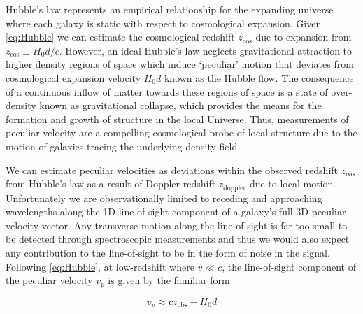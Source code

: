 Hubble's law represents an empirical relationship for the expanding
universe where each galaxy is static with respect to cosmological
expansion. Given \cref{eq:Hubble} we can estimate the
cosmological redshift \(z_\text{cos}\) due to expansion from
\(z_\text{cos} \equiv H_0 d/c\). However, an ideal Hubble's law neglects
gravitational attraction to higher density regions of space which induce
`peculiar' motion that deviates from cosmological expansion velocity
\(H_0d\) known as the Hubble flow. The consequence of a continuous
inflow of matter towards these regions of space is a state of
over-density known as gravitational collapse, which provides the means
for the formation and growth of structure in the local Universe. Thus,
measurements of peculiar velocity are a compelling cosmological probe of
local structure due to the motion of galaxies tracing the underlying
density field.

We can estimate peculiar velocities as deviations within the observed
redshift \(z_{obs}\) from Hubble's law as a result of Doppler redshift
\(z_\text{doppler}\) due to local motion. Unfortunately we are
observationally limited to receding and approaching wavelengths along
the 1D line-of-sight component of a galaxy's full 3D peculiar velocity
vector. Any transverse motion along the line-of-sight is far too small
to be detected through spectroscopic measurements and thus we would also
expect any contribution to the line-of-sight to be in the form of noise
in the signal. Following \cref{eq:Hubble}, at low-redshift
where \(v \ll c\), the line-of-sight component of the peculiar velocity
\(v_p\) is given by the familiar form

\begin{equation}v_p \approx cz_\text{obs} - H_0d\label{eq:pecveloapprox}\end{equation}

